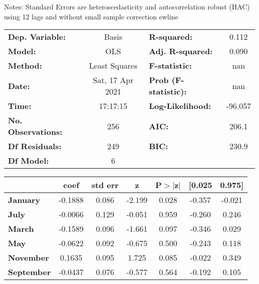Notes: \newline
 [1] Standard Errors are heteroscedasticity and autocorrelation robust (HAC) using 12 lags and without small sample correction
ewline\begin{center}
\begin{tabular}{lclc}
\toprule
\textbf{Dep. Variable:}    &      Basis       & \textbf{  R-squared:         } &     0.112   \\
\textbf{Model:}            &       OLS        & \textbf{  Adj. R-squared:    } &     0.090   \\
\textbf{Method:}           &  Least Squares   & \textbf{  F-statistic:       } &       nan   \\
\textbf{Date:}             & Sat, 17 Apr 2021 & \textbf{  Prob (F-statistic):} &      nan    \\
\textbf{Time:}             &     17:17:15     & \textbf{  Log-Likelihood:    } &   -96.057   \\
\textbf{No. Observations:} &         256      & \textbf{  AIC:               } &     206.1   \\
\textbf{Df Residuals:}     &         249      & \textbf{  BIC:               } &     230.9   \\
\textbf{Df Model:}         &           6      & \textbf{                     } &             \\
\bottomrule
\end{tabular}
\begin{tabular}{lcccccc}
                   & \textbf{coef} & \textbf{std err} & \textbf{z} & \textbf{P$> |$z$|$} & \textbf{[0.025} & \textbf{0.975]}  \\
\midrule
\textbf{January}   &      -0.1888  &        0.086     &    -2.199  &         0.028        &       -0.357    &       -0.021     \\
\textbf{July}      &      -0.0066  &        0.129     &    -0.051  &         0.959        &       -0.260    &        0.246     \\
\textbf{March}     &      -0.1589  &        0.096     &    -1.661  &         0.097        &       -0.346    &        0.029     \\
\textbf{May}       &      -0.0622  &        0.092     &    -0.675  &         0.500        &       -0.243    &        0.118     \\
\textbf{November}  &       0.1635  &        0.095     &     1.725  &         0.085        &       -0.022    &        0.349     \\
\textbf{September} &      -0.0437  &        0.076     &    -0.577  &         0.564        &       -0.192    &        0.105     \\

\end{tabular}
\end{center}
